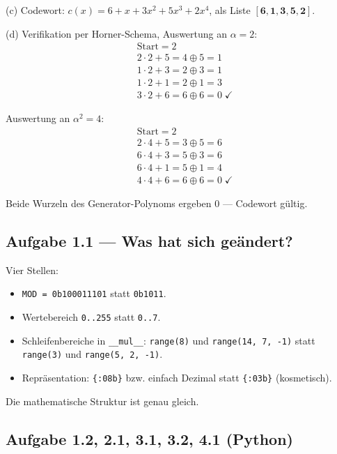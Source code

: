 (c) Codewort: $c(x) = 6 + x + 3 x^2 + 5 x^3 + 2 x^4$, als Liste
$\mathbf{[6, 1, 3, 5, 2]}$.

(d) Verifikation per Horner-Schema, Auswertung an $\alpha = 2$:
\begin{align*}
  &\text{Start} = 2 \\
  &2 \cdot 2 + 5 = 4 \oplus 5 = 1 \\
  &1 \cdot 2 + 3 = 2 \oplus 3 = 1 \\
  &1 \cdot 2 + 1 = 2 \oplus 1 = 3 \\
  &3 \cdot 2 + 6 = 6 \oplus 6 = 0 \;\checkmark
\end{align*}

Auswertung an $\alpha^2 = 4$:
\begin{align*}
  &\text{Start} = 2 \\
  &2 \cdot 4 + 5 = 3 \oplus 5 = 6 \\
  &6 \cdot 4 + 3 = 5 \oplus 3 = 6 \\
  &6 \cdot 4 + 1 = 5 \oplus 1 = 4 \\
  &4 \cdot 4 + 6 = 6 \oplus 6 = 0 \;\checkmark
\end{align*}

Beide Wurzeln des Generator-Polynoms ergeben 0 — Codewort gültig.

\subsection*{Aufgabe 1.1 — Was hat sich geändert?}

Vier Stellen:
\begin{itemize}
\item \texttt{MOD = 0b100011101} statt \texttt{0b1011}.
\item Wertebereich \texttt{0..255} statt \texttt{0..7}.
\item Schleifenbereiche in \texttt{\_\_mul\_\_}: \texttt{range(8)}
  und \texttt{range(14, 7, -1)} statt \texttt{range(3)} und
  \texttt{range(5, 2, -1)}.
\item Repräsentation: \texttt{\{:08b\}} bzw. einfach Dezimal statt
  \texttt{\{:03b\}} (kosmetisch).
\end{itemize}

Die mathematische Struktur ist genau gleich.

\subsection*{Aufgabe 1.2, 2.1, 3.1, 3.2, 4.1 (Python)}

